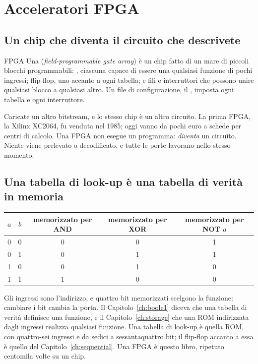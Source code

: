 \section{Acceleratori FPGA}

\subsection{Un chip che diventa il circuito che descrivete}

\begin{definition}{FPGA}
Una  (\emph{field-programmable gate array}) è un chip fatto di un
mare di piccoli blocchi programmabili: , ciascuna
capace di essere una qualsiasi funzione di pochi ingressi; flip-flop, uno
accanto a ogni tabella; e fili e interruttori che possono unire qualsiasi
blocco a qualsiasi altro. Un file di configurazione, il ,
imposta ogni tabella e ogni interruttore.
\end{definition}

Caricate un altro bitstream, e lo stesso chip è un altro circuito. La prima
FPGA, la Xilinx XC2064, fu venduta nel 1985; oggi vanno da pochi euro a schede
per centri di calcolo. Una FPGA non esegue un programma: \emph{diventa} un
circuito. Niente viene prelevato o decodificato, e tutte le porte lavorano
nello stesso momento.

\subsection{Una tabella di look-up è una tabella di verità in memoria}

\begin{center}\small\ttfamily
\begin{tabular}{cc|ccc}
\textrm{$a$}&\textrm{$b$}&\textrm{memorizzato per AND}&\textrm{memorizzato per XOR}&\textrm{memorizzato per NOT $a$}\\\hline
0&0&0&0&1\\0&1&0&1&1\\1&0&0&1&0\\1&1&1&0&0
\end{tabular}
\end{center}

Gli ingressi sono l'indirizzo, e quattro bit memorizzati scelgono la funzione:
cambiare i bit cambia la porta. Il Capitolo~\ref{ch:boole1} diceva che una
tabella di verità definisce una funzione, e il Capitolo~\ref{ch:storage} che
una ROM indirizzata dagli ingressi realizza qualsiasi funzione. Una tabella di
look-up è quella ROM, con quattro-sei ingressi e da sedici a sessantaquattro
bit; il flip-flop accanto a essa è quello del Capitolo~\ref{ch:sequential}.
Una FPGA è questo libro, ripetuto centomila volte su un chip.


